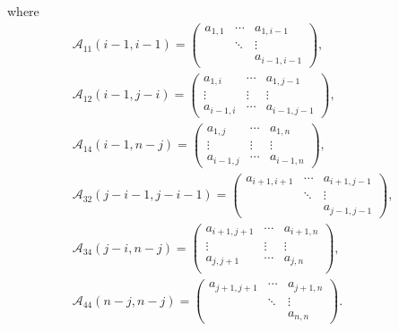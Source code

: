 \documentclass[10pt,a4paper]{amsart}
\numberwithin{equation}{section}
\def\A{\mathscr{A}}
\begin{document}
where
\begin{gather*}
\A_{11}(i-1,i-1)=
 \begin{pmatrix}
 a_{1, 1} & \cdots & a_{1, i-1}\\
 & \ddots & \vdots \\
 & & a_{i-1, i-1}
 \end{pmatrix}
,
 \\
 \A_{12}(i-1,j-i)=
 \begin{pmatrix}
 a_{1, i} & \cdots & a_{1, j-1}\\
 \vdots & \vdots & \vdots \\
 a_{i-1, i} & \cdots & a_{i-1, j-1}
 \end{pmatrix}
, \\
\A_{14}(i-1,n-j)=
 \begin{pmatrix}
 a_{1, j} & \cdots & a_{1, n}\\
 \vdots & \vdots & \vdots \\
 a_{i-1, j} & \cdots & a_{i-1, n}
 \end{pmatrix},
 \\
\A_{32}(j-i-1,j-i-1)=
 \begin{pmatrix}
 a_{i+1, i+1} & \cdots & a_{i+1, j-1}\\
 & \ddots & \vdots \\
 & & a_{j-1, j-1}
 \end{pmatrix}
,\\
 \A_{34}(j-i,n-j)=
 \begin{pmatrix}
 a_{i+1, j+1} & \cdots & a_{i+1, n}\\
 \vdots & \vdots & \vdots \\
 a_{j, j+1} & \cdots & a_{j, n}\\
 \end{pmatrix}
,
 \\
 \A_{44}(n-j,n-j)=
 \begin{pmatrix}
 a_{j+1, j+1} & \cdots & a_{j+1, n}\\
 & \ddots & \vdots \\
 & & a_{n,n}
 \end{pmatrix}.
 \end{gather*}
\end{document}
